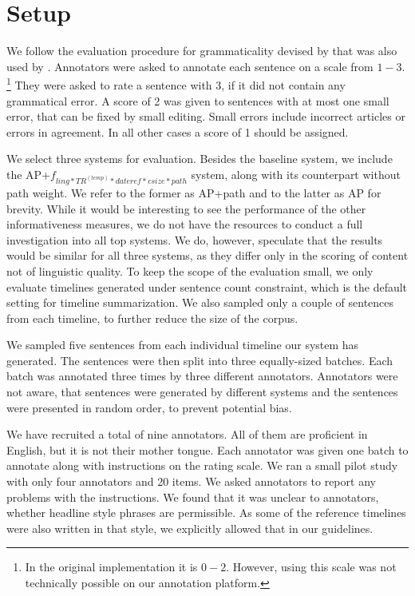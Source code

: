 \documentclass[a4paper,BCOR=10mm]{report}
\numberwithin{lemma}{chapter}
\numberwithin{definition}{chapter}
\begin{document}
\section{Setup}

We follow the evaluation procedure for grammaticality devised by \citet{mckeown} that was also used by \citet{filippova}.
Annotators were asked to annotate each sentence on a scale from $1-3$. \footnote{In the original implementation it is $0-2$. However, using this scale was not technically possible on our annotation platform.} They were asked to rate a sentence with 3, if it did not contain any grammatical error. A score of 2 was given to sentences with at most one small error, that can be fixed by small editing. Small errors include incorrect articles or errors in agreement. In all other cases a score of 1 should be assigned.

We select three systems for evaluation. Besides the baseline system, we include the AP+$f_{ ling*TR^{(temp)}*\mathit{dateref}*\mathit{csize}*\mathit{path} }$ system, along with its counterpart without path weight. We refer to the former as AP+path and to the latter as AP for brevity. While it would be interesting to see the performance of the other informativeness measures, we do not have the resources to conduct a full investigation into all top systems.
We do, however, speculate that the results would be similar for all three systems, as they differ only in the scoring of content not of linguistic quality.
To keep the scope of the evaluation small, we only evaluate timelines generated under sentence count constraint, which is the default setting for timeline summarization. We also sampled only a couple of sentences from each timeline, to further reduce the size of the corpus.

We sampled five sentences from each individual timeline our system has generated.
The sentences were then split into three equally-sized batches. Each batch was annotated three times by three different annotators.
Annotators were not aware, that sentences were generated by different systems and the sentences were presented in random order, to prevent potential bias.

We have recruited a total of nine annotators. All of them are proficient in English, but it is not their mother tongue.
Each annotator was given one batch to annotate along with instructions on the rating scale. We ran a small pilot study with only four annotators and 20 items. We asked annotators to report any problems with the instructions. We found that it was unclear to annotators, whether headline style phrases are permissible.
As some of the reference timelines were also written in that style, we explicitly allowed that in our guidelines.
\end{document}

